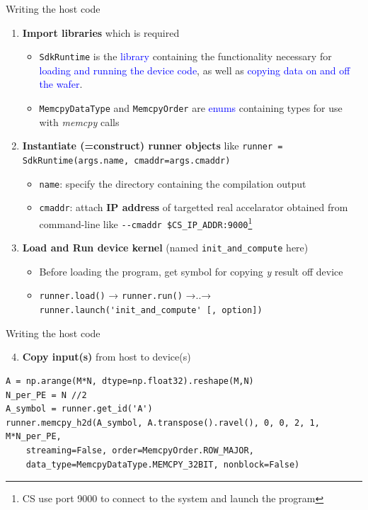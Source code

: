\documentclass[dvipdfmx, 11pt, aspectratio=169]{beamer}   %
\begin{document}
\begin{frame}[fragile]{Writing the host code}
\begin{enumerate}
    \item \textbf{Import libraries} which is required
    \begin{itemize}
        \item \lstinline|SdkRuntime| is the \textcolor{blue}{library} containing the functionality necessary for \textcolor{blue}{loading and running the device code}, as well as \textcolor{blue}{copying data on and off the wafer}.
        \item \lstinline|MemcpyDataType| and \lstinline|MemcpyOrder| are \textcolor{blue}{enums} containing types for use with \textit{memcpy} calls
    \end{itemize}
    \item \textbf{Instantiate (=construct) runner objects} like \lstinline|runner = SdkRuntime(args.name, cmaddr=args.cmaddr)| %
    \begin{itemize}
        \item \lstinline|name|: specify the directory containing the compilation output
        \item \lstinline|cmaddr|: attach \textbf{IP address} of targetted real accelarator obtained from command-line like \lstinline|--cmaddr $CS_IP_ADDR:9000|\footnote{CS use port 9000 to connect to the system and launch the program}
    \end{itemize}
    \item \textbf{Load and Run device kernel} (named \lstinline|init_and_compute| here)
    \begin{itemize}
        \item Before loading the program, get symbol for copying \textit{y} result off device
        \item \lstinline|runner.load()| → \lstinline|runner.run()| →..→ \lstinline|runner.launch('init_and_compute' [, option])|
    \end{itemize}
\end{enumerate}
\end{frame}
\begin{frame}[fragile]{Writing the host code}
\begin{enumerate}\setcounter{enumi}{3}
    \item \textbf{Copy input(s)} from host to device(s)
\end{enumerate}
\begin{lstlisting}[language=CSL]
A = np.arange(M*N, dtype=np.float32).reshape(M,N)
N_per_PE = N //2
A_symbol = runner.get_id('A')
runner.memcpy_h2d(A_symbol, A.transpose().ravel(), 0, 0, 2, 1, M*N_per_PE, 
    streaming=False, order=MemcpyOrder.ROW_MAJOR, 
    data_type=MemcpyDataType.MEMCPY_32BIT, nonblock=False)
\end{lstlisting}
\end{frame}
\end{document}
